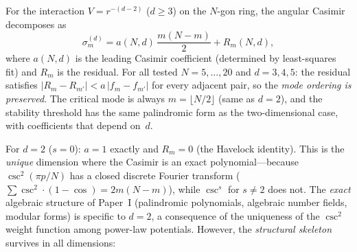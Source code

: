 \begin{proposition}
\label{prop:soft-havelock}
For the interaction $V = r^{-(d-2)}$ ($d \ge 3$) on the $N$-gon ring,
the angular Casimir decomposes as
\begin{equation}\label{eq:soft-havelock}
  \sigma_m^{(d)} = a(N,d)\,\frac{m(N{-}m)}{2} + R_m(N,d),
\end{equation}
where $a(N,d)$ is the leading Casimir coefficient (determined by
least-squares fit) and $R_m$ is the residual.
For all tested $N = 5,\ldots,20$ and $d = 3,4,5$: the
residual satisfies $|R_m - R_{m'}| < a\,|f_m - f_{m'}|$ for every
adjacent pair, so the \emph{mode ordering is preserved}.
The critical mode is always $m = \lfloor N/2 \rfloor$ (same as $d=2$),
and the stability threshold has the same palindromic form as the
two-dimensional case, with coefficients that depend on~$d$.
\end{proposition}

\noindent
For $d = 2$ ($s = 0$): $a = 1$ exactly and $R_m = 0$ (the Havelock
identity). This is the \emph{unique} dimension where the Casimir is
an exact polynomial---because $\csc^2(\pi p/N)$ has a closed discrete
Fourier transform ($\sum\csc^2\cdot(1{-}\cos) = 2m(N{-}m)$), while
$\csc^s$ for $s \ne 2$ does not.
The \emph{exact} algebraic structure of Paper~I (palindromic polynomials,
algebraic number fields, modular forms) is specific to $d = 2$,
a consequence of the uniqueness of the $\csc^2$ weight function
among power-law potentials.
However, the \emph{structural skeleton} survives in all dimensions:

